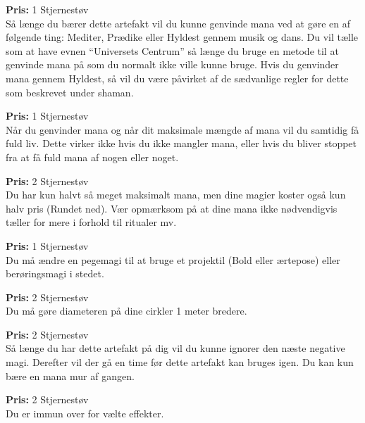\begin{artefakt*}
\textbf{Pris:} 1 Stjernestøv\\
Så længe du bærer dette artefakt vil du kunne genvinde mana ved at gøre en af følgende ting: Mediter, Prædike eller Hyldest gennem musik og dans. Du vil tælle som at have evnen “Universets Centrum” så længe du bruge en metode til at genvinde mana på som du normalt ikke ville kunne bruge. Hvis du genvinder mana gennem Hyldest, så vil du være påvirket af de sædvanlige regler for dette som beskrevet under shaman.
\end{artefakt*} 

\begin{artefakt*}
\textbf{Pris:} 1 Stjernestøv\\
Når du genvinder mana og når dit maksimale mængde af mana vil du samtidig få fuld liv. Dette virker ikke hvis du ikke mangler mana, eller hvis du bliver stoppet fra at få fuld mana af nogen eller noget.
\end{artefakt*}

\begin{artefakt*}
\textbf{Pris:} 2 Stjernestøv\\
Du har kun halvt så meget maksimalt mana, men dine magier koster også kun halv pris (Rundet ned). Vær opmærksom på at dine mana ikke nødvendigvis tæller for mere i forhold til ritualer mv.
\end{artefakt*}

\begin{artefakt*}
\textbf{Pris:} 1 Stjernestøv\\
Du må ændre en pegemagi til at bruge et projektil (Bold eller ærtepose) eller berøringsmagi i stedet.
\end{artefakt*}

\begin{artefakt*}
\textbf{Pris:} 2 Stjernestøv\\
Du må gøre diameteren på dine cirkler 1 meter bredere. 
\end{artefakt*}

\begin{artefakt*}
\textbf{Pris:} 2 Stjernestøv\\
Så længe du har dette artefakt på dig vil du kunne ignorer den næste negative magi. Derefter vil der gå en time før dette artefakt kan bruges igen. Du kan kun bære en mana mur af gangen.
\end{artefakt*}

\begin{artefakt*}
\textbf{Pris:} 2 Stjernestøv\\
Du er immun over for vælte effekter.
\end{artefakt*}

